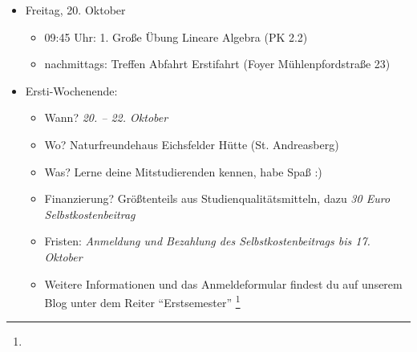 \begin{itemize}
	\item Freitag, 20. Oktober
	\begin{itemize}
		\item 09:45 Uhr: 1. Große Übung Lineare Algebra (PK 2.2)
        \item nachmittags: Treffen Abfahrt Erstifahrt (Foyer Mühlenpfordstraße 23)
	\end{itemize}
	\item Ersti-Wochenende:
	\begin{itemize}
		\item Wann? \emph{20. – 22. Oktober}
		\item Wo? Naturfreundehaus Eichsfelder Hütte (St. Andreasberg)
		\item Was? Lerne deine Mitstudierenden kennen, habe Spaß :)
		\item Finanzierung? Größtenteils aus Studienqualitätsmitteln, dazu \emph{30 Euro Selbstkostenbeitrag}
		\item Fristen: \emph{Anmeldung und Bezahlung des Selbstkostenbeitrags bis 17. Oktober}
		\item Weitere Informationen und das Anmeldeformular findest du auf unserem Blog unter dem Reiter \enquote{Erstsemester} \footnote{}
	\end{itemize}
\end{itemize}